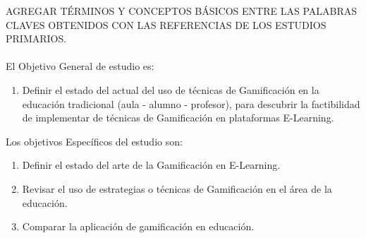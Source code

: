 \documentclass[•]{article}
\begin{document}
AGREGAR TÉRMINOS Y CONCEPTOS BÁSICOS ENTRE LAS PALABRAS CLAVES OBTENIDOS CON LAS REFERENCIAS DE LOS ESTUDIOS PRIMARIOS.\\ \\


El Objetivo General de estudio es:
\begin{enumerate}
	\item Definir el estado del actual del uso de técnicas de Gamificación en la educación tradicional (aula - alumno - profesor), para descubrir la factibilidad de implementar de técnicas de Gamificación en plataformas E-Learning.
\end{enumerate}
Los objetivos Específicos del estudio son:
\begin{enumerate}
	\item Definir el estado del arte de la Gamificación en E-Learning.
	\item Revisar el uso de estrategias o técnicas de Gamificación en el área de la educación.
	\item Comparar la aplicación de gamificación en educación.
\end{enumerate}

\end{document}

